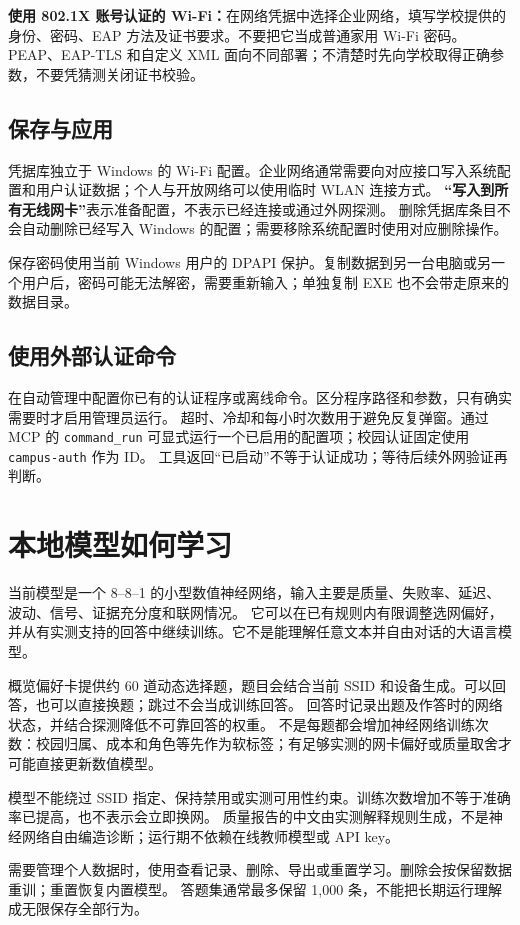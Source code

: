 \documentclass[UTF8,fontset=fandol,11pt,a4paper]{ctexart}
\newcommand{\ui}[1]{\textbf{“#1”}}
\newcommand{\tool}[1]{\nolinkurl{#1}}
\begin{document}
\textbf{使用 802.1X 账号认证的 Wi-Fi：}在网络凭据中选择企业网络，填写学校提供的身份、密码、EAP 方法及证书要求。不要把它当成普通家用 Wi-Fi 密码。
PEAP、EAP-TLS 和自定义 XML 面向不同部署；不清楚时先向学校取得正确参数，不要凭猜测关闭证书校验。

\subsection{保存与应用}
凭据库独立于 Windows 的 Wi-Fi 配置。企业网络通常需要向对应接口写入系统配置和用户认证数据；个人与开放网络可以使用临时 WLAN 连接方式。
\ui{写入到所有无线网卡}表示准备配置，不表示已经连接或通过外网探测。
删除凭据库条目不会自动删除已经写入 Windows 的配置；需要移除系统配置时使用对应删除操作。

保存密码使用当前 Windows 用户的 DPAPI 保护。复制数据到另一台电脑或另一个用户后，密码可能无法解密，需要重新输入；单独复制 EXE 也不会带走原来的数据目录。

\subsection{使用外部认证命令}
在自动管理中配置你已有的认证程序或离线命令。区分程序路径和参数，只有确实需要时才启用管理员运行。
超时、冷却和每小时次数用于避免反复弹窗。通过 MCP 的 \tool{command_run} 可显式运行一个已启用的配置项；校园认证固定使用 \tool{campus-auth} 作为 ID。
工具返回“已启动”不等于认证成功；等待后续外网验证再判断。

\section{本地模型如何学习}
当前模型是一个 8--8--1 的小型数值神经网络，输入主要是质量、失败率、延迟、波动、信号、证据充分度和联网情况。
它可以在已有规则内有限调整选网偏好，并从有实测支持的回答中继续训练。它不是能理解任意文本并自由对话的大语言模型。

概览偏好卡提供约 60 道动态选择题，题目会结合当前 SSID 和设备生成。可以回答，也可以直接换题；跳过不会当成训练回答。
回答时记录出题及作答时的网络状态，并结合探测降低不可靠回答的权重。
不是每题都会增加神经网络训练次数：校园归属、成本和角色等先作为软标签；有足够实测的网卡偏好或质量取舍才可能直接更新数值模型。

模型不能绕过 SSID 指定、保持禁用或实测可用性约束。训练次数增加不等于准确率已提高，也不表示会立即换网。
质量报告的中文由实测解释规则生成，不是神经网络自由编造诊断；运行期不依赖在线教师模型或 API key。

需要管理个人数据时，使用查看记录、删除、导出或重置学习。删除会按保留数据重训；重置恢复内置模型。
答题集通常最多保留 1,000 条，不能把长期运行理解成无限保存全部行为。
\end{document}
